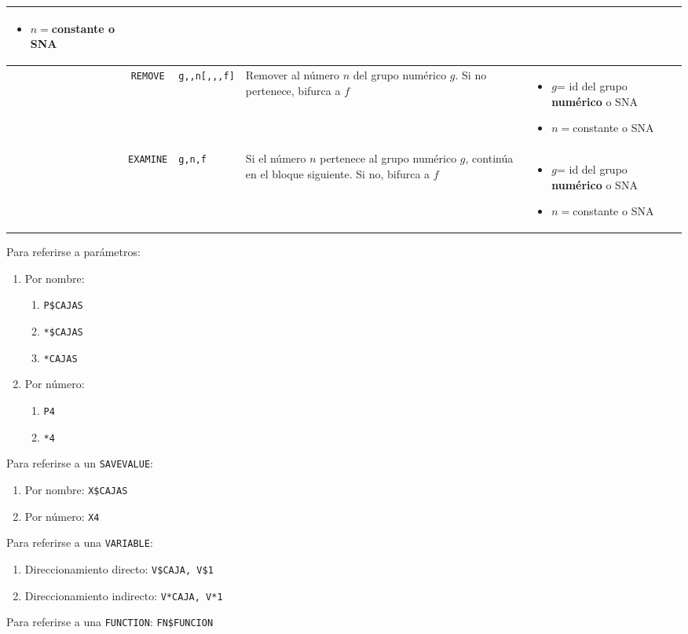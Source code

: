 \documentclass[12pt,a4paper, twoside]{paquetes-apunte/apunte}
\providecommand{\tabularnewline}{\\}
\begin{document}
\begin{longtable}{|lc>{\raggedright}p{3cm}|>{\raggedright}p{5cm}|>{\raggedright}p{7cm}|>{\raggedright}p{4cm}|}
\begin{itemize}
\item $n=$constante o SNA\end{itemize}
 & \tabularnewline
\hline 
 & \texttt{REMOVE} & \texttt{g,,n{[},,,f{]}} & Remover al número $n$ del grupo numérico $g$. Si no pertenece, bifurca
a $f$ & \begin{itemize}
\item $g$= id del grupo \textbf{numérico} o SNA
\item $n=$constante o SNA\end{itemize}
 & \tabularnewline
\hline 
 & \texttt{EXAMINE} & \texttt{g,n,f} & Si el número $n$ pertenece al grupo numérico $g$, continúa en el
bloque siguiente. Si no, bifurca a $f$ & \begin{itemize}
\item $g$= id del grupo \textbf{numérico} o SNA
\item $n=$constante o SNA\end{itemize}
 & \tabularnewline
\hline 
\end{longtable}

\pagebreak{}Para referirse a parámetros:
\begin{enumerate}
\item Por nombre: 

\begin{enumerate}
\item \texttt{P\$CAJAS}
\item \texttt{{*}\$CAJAS}
\item \texttt{{*}CAJAS}
\end{enumerate}
\item Por número:

\begin{enumerate}
\item \texttt{P4}
\item \texttt{{*}4}
\end{enumerate}
\end{enumerate}
Para referirse a un \texttt{SAVEVALUE}:
\begin{enumerate}
\item Por nombre: \texttt{X\$CAJAS}
\item Por número: \texttt{X4}
\end{enumerate}
Para referirse a una \texttt{VARIABLE}: 
\begin{enumerate}
\item Direccionamiento directo: \texttt{V\$CAJA, V\$1}
\item Direccionamiento indirecto: \texttt{V{*}CAJA, V{*}1}
\end{enumerate}
Para referirse a una \texttt{FUNCTION}: \texttt{FN\$FUNCION}
\end{document}
